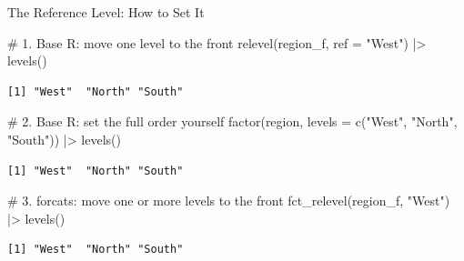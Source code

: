 \documentclass[
  ignorenonframetext,
  aspectratio=169,
]{beamer}
\newenvironment{Shaded}{\begin{snugshade}}{\end{snugshade}}
\newcommand{\AttributeTok}[1]{\textcolor[rgb]{0.40,0.45,0.13}{#1}}
\newcommand{\CommentTok}[1]{\textcolor[rgb]{0.37,0.37,0.37}{#1}}
\newcommand{\FunctionTok}[1]{\textcolor[rgb]{0.28,0.35,0.67}{#1}}
\newcommand{\NormalTok}[1]{\textcolor[rgb]{0.00,0.23,0.31}{#1}}
\newcommand{\SpecialCharTok}[1]{\textcolor[rgb]{0.37,0.37,0.37}{#1}}
\newcommand{\StringTok}[1]{\textcolor[rgb]{0.13,0.47,0.30}{#1}}
\begin{document}
\begin{frame}[fragile]{The Reference Level: How to Set It}
\protect\hypertarget{the-reference-level-how-to-set-it}{}
\begin{Shaded}
\begin{Highlighting}[]
\CommentTok{\# 1. Base R: move one level to the front}
\FunctionTok{relevel}\NormalTok{(region\_f, }\AttributeTok{ref =} \StringTok{"West"}\NormalTok{) }\SpecialCharTok{|\textgreater{}} \FunctionTok{levels}\NormalTok{()}
\end{Highlighting}
\end{Shaded}

\begingroup\tiny\color{darkgray}

\begin{verbatim}
[1] "West"  "North" "South"
\end{verbatim}

\endgroup

\begin{Shaded}
\begin{Highlighting}[]
\CommentTok{\# 2. Base R: set the full order yourself}
\FunctionTok{factor}\NormalTok{(region, }\AttributeTok{levels =} \FunctionTok{c}\NormalTok{(}\StringTok{"West"}\NormalTok{, }\StringTok{"North"}\NormalTok{, }\StringTok{"South"}\NormalTok{)) }\SpecialCharTok{|\textgreater{}} \FunctionTok{levels}\NormalTok{()}
\end{Highlighting}
\end{Shaded}

\begingroup\tiny\color{darkgray}

\begin{verbatim}
[1] "West"  "North" "South"
\end{verbatim}

\endgroup

\begin{Shaded}
\begin{Highlighting}[]
\CommentTok{\# 3. forcats: move one or more levels to the front}
\FunctionTok{fct\_relevel}\NormalTok{(region\_f, }\StringTok{"West"}\NormalTok{) }\SpecialCharTok{|\textgreater{}} \FunctionTok{levels}\NormalTok{()}
\end{Highlighting}
\end{Shaded}

\begingroup\tiny\color{darkgray}

\begin{verbatim}
[1] "West"  "North" "South"
\end{verbatim}

\endgroup
\end{frame}
\end{document}
